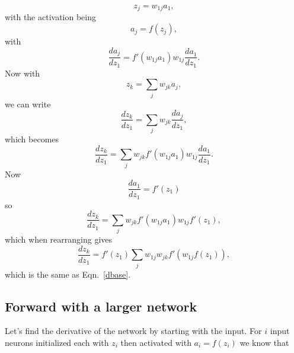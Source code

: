 \documentclass[12pt]{article}
\begin{document}
\begin{equation}
z_j=w_{1j}{a_1},
\end{equation}
with the activation being
\begin{equation}
a_j=f(z_j),
\end{equation}
with
\begin{equation}
\label{dcore_idea}
\frac{da_j}{dz_1}=f'(w_{1j}a_1)w_{1j}\frac{da_1}{dz_1}.
\end{equation}
Now with
\begin{equation}
z_k=\sum_j w_{jk} a_j,
\end{equation}
we can write
\begin{equation}
\frac{dz_k}{dz_1}=\sum_j w_{jk}\frac{da_j}{dz_1},
\end{equation}
which becomes
\begin{equation}
\frac{dz_k}{dz_1}=\sum_j w_{jk}f'(w_{1j}a_1)w_{1j}\frac{da_1}{dz_1}.
\end{equation}
Now
\begin{equation}
\frac{da_1}{dz_1}=f'(z_1)
\end{equation}
so
\begin{equation}
\frac{dz_k}{dz_1}=\sum_j w_{jk}f'(w_{1j}a_1)w_{1j}f'(z_1),
\end{equation}
which when rearranging gives
\begin{equation}
\frac{dz_k}{dz_1}=f'(z_1)\sum_j w_{1j} w_{jk}f'(w_{1j}f(z_1)),
\end{equation}
which is the same as Eqn.~\ref{dbase}.

\subsection{Forward with a larger network}

Let's find the derivative of the network by starting with the input. For $i$ input neurons initialized each with $z_i$ then activated with $a_i=f(z_i)$ we know that 
\end{document}
